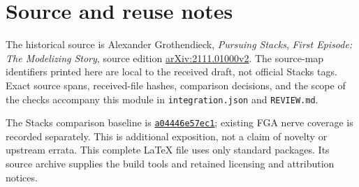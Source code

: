 \documentclass[11pt]{amsart}
\theoremstyle{remark}
\begin{document}
\section*{Source and reuse notes}
The historical source is Alexander Grothendieck, \emph{Pursuing Stacks},
\emph{First Episode: The Modelizing Story}, source edition
\href{https://arxiv.org/abs/2111.01000}{arXiv:2111.01000v2}.
The source-map identifiers printed here are local to the received draft,
not official Stacks tags. Exact source spans, received-file hashes,
comparison decisions, and the scope of the checks accompany this module
in \texttt{integration.json} and \texttt{REVIEW.md}.

The Stacks comparison baseline is
\href{https://github.com/stacks/stacks-project/tree/a04446e57ec1fbc252a871afcec7752fb2807b14}{\texttt{a04446e57ec1}};
existing FGA nerve coverage is recorded separately. This is additional
exposition, not a claim of novelty or upstream errata. This complete
LaTeX file uses only standard packages. Its source archive supplies the
build tools and retained licensing and attribution notices.
\end{document}

